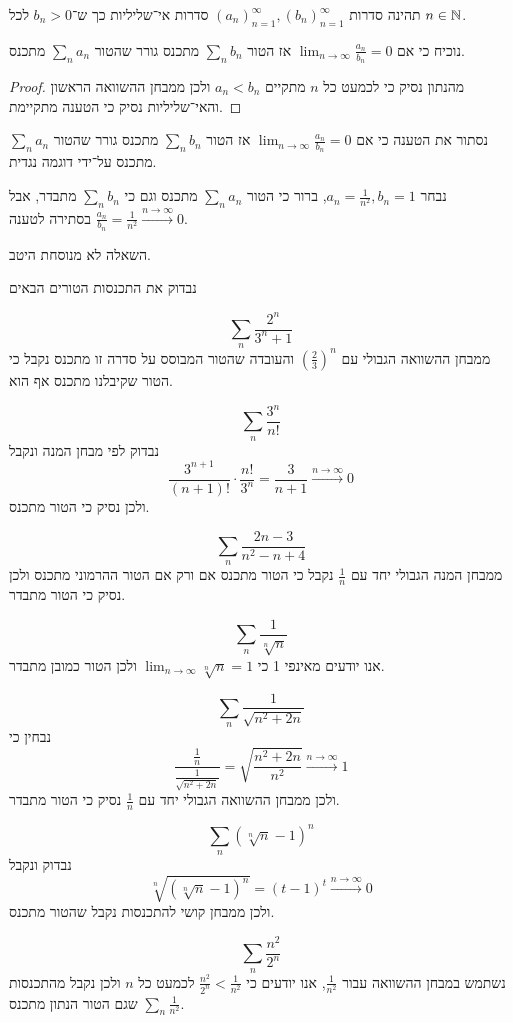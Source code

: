 \Question{}
תהינה סדרות ${(a_n)}_{n = 1}^\infty, {(b_n)}_{n = 1}^\infty$ סדרות אי־שליליות כך ש־$b_n > 0$ לכל $n \in \mathbb{N}$.

\Subquestion{}
נוכיח כי אם $\lim_{n \to \infty} \frac{a_n}{b_n} = 0$ אז הטור $\sum_n b_n$ מתכנס גורר שהטור $\sum_n a_n$ מתכנס.
\begin{proof}
	מהנתון נסיק כי לכמעט כל $n$ מתקיים $a_n < b_n$ ולכן ממבחן ההשוואה הראשון והאי־שליליות נסיק כי הטענה מתקיימת.
\end{proof}

\Subquestion{}
נסתור את הטענה כי אם $\lim_{n \to \infty} \frac{a_n}{b_n} = 0$ אז הטור $\sum_n b_n$ מתכנס גורר שהטור $\sum_n a_n$ מתכנס על־ידי דוגמה נגדית.

נבחר $a_n = \frac{1}{n^2}, b_n = 1$, ברור כי הטור $\sum_n a_n$ מתכנס וגם כי $\sum_n b_n$ מתבדר, אבל $\frac{a_n}{b_n} = \frac{1}{n^2} \xrightarrow{n \to \infty} 0$ בסתירה לטענה.

\Subquestion{}
השאלה לא מנוסחת היטב.

\Question{}
נבדוק את התכנסות הטורים הבאים

\Subquestion{}
\[
	\sum_n \frac{2^n}{3^n + 1}
\]
ממבחן ההשוואה הגבולי עם ${\left(\frac{2}{3}\right)}^n$ והעובדה שהטור המבוסס על סדרה זו מתכנס נקבל כי הטור שקיבלנו מתכנס אף הוא.

\Subquestion{}
\[
	\sum_n \frac{3^n}{n!}
\]
נבדוק לפי מבחן המנה ונקבל
\[
	\frac{3^{n + 1}}{(n + 1)!}
	\cdot \frac{n!}{3^n}
	= \frac{3}{n + 1} \xrightarrow{n \to \infty} 0
\]
ולכן נסיק כי הטור מתכנס.

\Subquestion{}
\[
	\sum_n \frac{2n - 3}{n^2 - n + 4}
\]
ממבחן המנה הגבולי יחד עם $\frac{1}{n}$ נקבל כי הטור מתכנס אם ורק אם הטור ההרמוני מתכנס ולכן נסיק כי הטור מתבדר.

\Subquestion{}
\[
	\sum_n \frac{1}{\sqrt[n]{n}}
\]
אנו יודעים מאינפי 1 כי $\lim_{n \to \infty} \sqrt[n]{n} = 1$ ולכן הטור כמובן מתבדר.

\Subquestion{}
\[
	\sum_n \frac{1}{\sqrt{n^2 + 2n}}
\]
נבחין כי
\[
	\frac{\frac{1}{n}}{\frac{1}{\sqrt{n^2 + 2n}}} = \sqrt{\frac{n^2 + 2n}{n^2}} \xrightarrow{n \to \infty} 1
\]
ולכן ממבחן ההשוואה הגבולי יחד עם $\frac{1}{n}$ נסיק כי הטור מתבדר.

\Subquestion{}
\[
	\sum_n {(\sqrt[n]{n} - 1)}^n
\]
נבדוק ונקבל
\[
	\sqrt[n]{{(\sqrt[n]{n} - 1)}^n}
	= {(t - 1)}^t
	\xrightarrow{n \to \infty} 0
\]
ולכן ממבחן קושי להתכנסות נקבל שהטור מתכנס.

\Subquestion{}
\[
	\sum_n \frac{n^2}{2^n}
\]
נשתמש במבחן ההשוואה עבור $\frac{1}{n^2}$, אנו יודעים כי $\frac{n^2}{2^n} < \frac{1}{n^2}$ לכמעט כל $n$ ולכן נקבל מהתכנסות $\sum_n \frac{1}{n^2}$ שגם הטור הנתון מתכנס.


